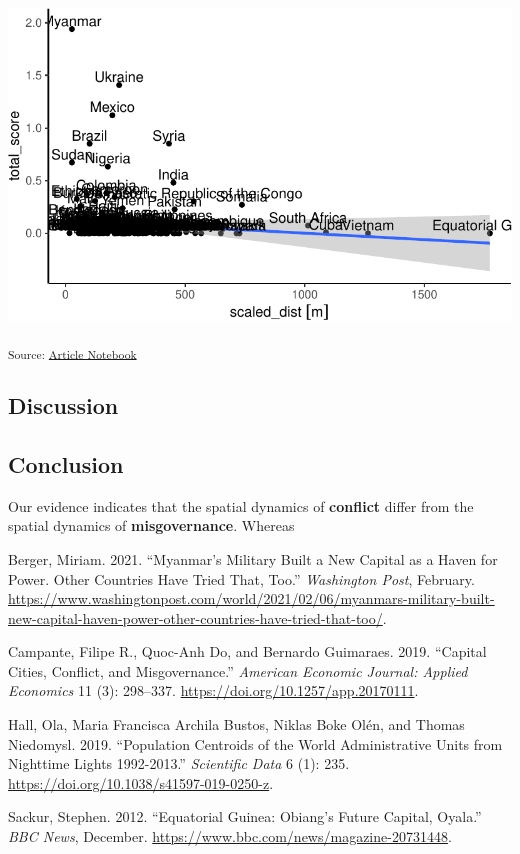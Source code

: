 \documentclass[
  letterpaper,
  DIV=11,
  numbers=noendperiod]{scrartcl}
\newlength{\cslhangindent}
\newenvironment{CSLReferences}[2] %
 {\begin{list}{}{%
  \setlength{\itemindent}{0pt}
  \setlength{\leftmargin}{0pt}
  \setlength{\parsep}{0pt}
  \ifodd #1
   \setlength{\leftmargin}{\cslhangindent}
   \setlength{\itemindent}{-1\cslhangindent}
  \fi
  \setlength{\itemsep}{#2\baselineskip}}}
 {\end{list}}
\begin{document}
\includegraphics{index_files/figure-pdf/unnamed-chunk-5-1.pdf}

\textsubscript{Source:
\href{https://jpowerj.github.io/gis-manuscript-template/index.qmd.html}{Article
Notebook}}

\subsection{Discussion}\label{discussion}

\subsection{Conclusion}\label{conclusion}

Our evidence indicates that the spatial dynamics of \textbf{conflict}
differ from the spatial dynamics of \textbf{misgovernance}. Whereas

\label{refs}
\begin{CSLReferences}{1}{0}
Berger, Miriam. 2021. {``Myanmar's Military Built a New Capital as a
Haven for Power. {Other} Countries Have Tried That, Too.''}
\emph{Washington Post}, February.
\url{https://www.washingtonpost.com/world/2021/02/06/myanmars-military-built-new-capital-haven-power-other-countries-have-tried-that-too/}.

Campante, Filipe R., Quoc-Anh Do, and Bernardo Guimaraes. 2019.
{``Capital {Cities}, {Conflict}, and {Misgovernance}.''} \emph{American
Economic Journal: Applied Economics} 11 (3): 298--337.
\url{https://doi.org/10.1257/app.20170111}.

Hall, Ola, Maria Francisca Archila Bustos, Niklas Boke Olén, and Thomas
Niedomysl. 2019. {``Population Centroids of the World Administrative
Units from Nighttime Lights 1992-2013.''} \emph{Scientific Data} 6 (1):
235. \url{https://doi.org/10.1038/s41597-019-0250-z}.

Sackur, Stephen. 2012. {``Equatorial {Guinea}: {Obiang}'s Future
Capital, {Oyala}.''} \emph{BBC News}, December.
\url{https://www.bbc.com/news/magazine-20731448}.

\end{CSLReferences}
\end{document}
